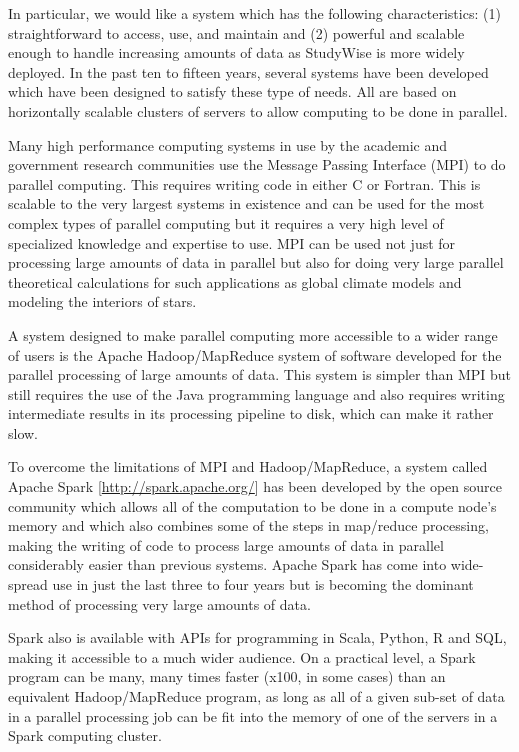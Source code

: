 \documentclass[runningheads,a4paper]{llncs}
\begin{document}
In particular, we would like a system which has the following characteristics:  (1) straightforward to access, use, and maintain and (2) powerful and scalable enough to handle increasing amounts of data as StudyWise is more widely deployed.  In the past ten to fifteen years, several systems have been developed which have been designed to satisfy these type of needs.  All are based on horizontally scalable clusters of servers to allow computing to be done in parallel.

Many high performance computing systems in use by the academic and government research communities use the Message Passing Interface (MPI) to do parallel computing.  This requires writing code in either C or Fortran.  This is scalable to the very largest systems in existence and can be used for the most complex types of parallel computing but it requires a very high level of specialized knowledge and expertise to use.  MPI can be used not just for processing large amounts of data in parallel but also for doing very large parallel theoretical calculations for such applications as global climate models and modeling the interiors of stars.

A system designed to make parallel computing more accessible to a wider range of users is the Apache Hadoop/MapReduce system of software developed for the parallel processing of large amounts of data.  This system is simpler than MPI but still requires the use of the Java programming language and also requires writing intermediate results in its processing pipeline to disk, which can make it rather slow.

To overcome the limitations of MPI and Hadoop/MapReduce, a system called Apache Spark [\url{http://spark.apache.org/}] has been developed by the open source community which allows all of the computation to be done in a compute node's memory and which also combines some of the steps in map/reduce processing, making the writing of code to process large amounts of data in parallel considerably easier than previous systems.  Apache Spark has come into wide-spread use in just the last three to four years but is becoming the dominant method of processing very large amounts of data.  

Spark also is available with APIs for programming in Scala, Python, R and SQL, making it accessible to a much wider audience.  On a practical level, a Spark program can be many, many times faster (x100, in some cases) than an equivalent Hadoop/MapReduce program, as long as all of a given sub-set of data in a parallel processing job can be fit into the memory of one of the servers in a Spark computing cluster.
\end{document}
